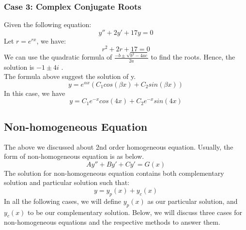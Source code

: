 \documentclass{article}
\begin{document}
\subsubsection{Case 3: Complex Conjugate Roots}
Given the following equation:
\begin{equation*}
	y''+2y'+17y=0
\end{equation*}
Let $r = e^{rx}$, we have:
\begin{equation*}
	r^2+2r+17=0
\end{equation*}
We can use the quadratic formula of $\frac{-b\pm \sqrt{b^2-4ac}} {2a}$ to find the roots. Hence, the solution is $-1\pm4i$
.\\
The formula above suggest the solution of y.
\begin{equation*}
	y = e^{\alpha x}(C_1cos(\beta x) + C_2sin(\beta x))
\end{equation*}
In this case, we have
\begin{equation*}
	y = C_1e^{-x}cos(4x) + C_2e^{-x}sin(4x)
\end{equation*}
\subsection{Non-homogeneous Equation}
The above we discussed about 2nd order homogeneous equation. Usually, the form of non-homogeneous equation is as below.
\begin{equation*}
	Ay''+By'+Cy'=G(x)
\end{equation*}
The solution for non-homogeneous equation contains both complementary solution and particular solution such that:
\begin{equation*}
	y = y_p(x) + y_c(x)
\end{equation*}
In all the following cases, we will define $y_p(x)$ as our particular solution, and $y_c(x)$ to be our complementary solution.
Below, we will discuss three cases for non-homogeneous equations and the respective methods to answer them.
\end{document}
